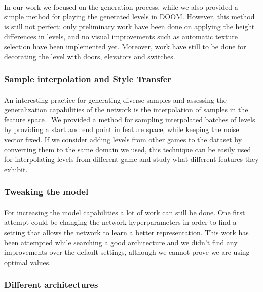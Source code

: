 \paragraph{} In our work we focused on the generation process, while we also provided a simple method for playing the generated levels in DOOM. However, this method is still not perfect: only preliminary work have been done on applying the height differences in levels, and no visual improvements such as automatic texture selection have been implemented yet. Moreover, work have still to be done for decorating the level with doors, elevators and switches. 

 \subsubsection{Sample interpolation and Style Transfer}
\paragraph{} An interesting practice for generating diverse samples and assessing the generalization capabilities of the network is the interpolation of samples in the feature space \cite{slerp}. We provided a method for sampling interpolated batches of levels by providing a start and end point in feature space, while keeping the noise vector fixed. If we consider adding levels from other games to the dataset by converting them to the same domain we used, this technique can be easily used for interpolating levels from different game and study what different features they exhibit.

\subsubsection{Tweaking the model}
\paragraph{} For increasing the model capabilities a lot of work can still be done. One first attempt could be changing the network hyperparameters in order to find a setting that allows the network to learn a better representation. This work has been attempted while searching a good architecture and we didn't find any improvements over the default settings, although we cannot prove we are using optimal values.

\subsubsection{Different architectures}
